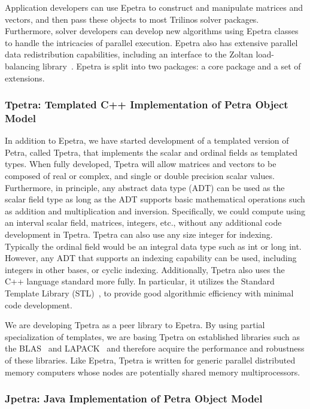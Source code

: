 \documentclass[acmtoms,acmnow]{acmtrans2m}
\begin{document}
Application developers can use Epetra to construct and manipulate matrices
and vectors, and then pass these objects to most Trilinos solver packages.
Furthermore, solver developers can develop new algorithms using 
Epetra classes to handle the intricacies of parallel execution.  
Epetra also has extensive parallel data  redistribution capabilities, 
including an interface to the Zoltan load-balancing
library~\cite{zoltan-ug}.  Epetra is split into two packages:  a core
package and a set of extensions.

\subsubsection{Tpetra: Templated C++ Implementation of Petra Object Model}

In addition to Epetra, we have started development of a templated 
version of Petra, called Tpetra, that implements the scalar and 
ordinal fields as templated types.  When fully developed, Tpetra 
will allow matrices and vectors to be composed of real or complex, 
and single or double precision scalar values.  Furthermore, in 
principle, any abstract data type (ADT) can be used as the scalar 
field type as long as the ADT supports basic mathematical operations 
such as addition and multiplication and inversion. Specifically, we 
could compute using an interval scalar field, matrices, integers, etc., 
without any additional code development in Tpetra.  Tpetra can also 
use any size integer for indexing.  Typically the ordinal field would 
be an integral data type such as int or long int.  However, any ADT 
that supports an indexing capability can be used, including integers in 
other bases, or cyclic indexing. Additionally, Tpetra also uses the 
C++ language standard more fully.  In particular, it utilizes the 
Standard Template Library (STL)~\cite{Stroustrup}, to provide good 
algorithmic efficiency with minimal code development.

We are developing Tpetra as a peer library to Epetra. By using partial
specialization of templates, we are basing Tpetra on established libraries 
such as the BLAS~\cite{BLAS1,BLAS2,BLAS3} and LAPACK~\cite{lapack} and 
therefore acquire the performance and robustness of these libraries.
Like Epetra, Tpetra is written for generic parallel distributed
memory computers whose nodes are
potentially shared memory multiprocessors.

\subsubsection{Jpetra: Java Implementation of Petra Object Model}
\end{document}
